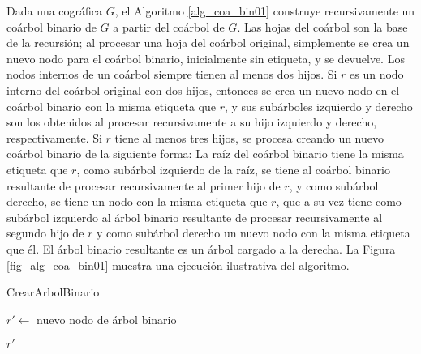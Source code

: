 Dada una cogr\'afica $G$, el Algoritmo \ref{alg_coa_bin01} construye
recursivamente un co\'arbol binario de $G$ a partir del co\'arbol de $G$.
Las hojas del co\'arbol son la base de la recursi\'on; al procesar una hoja
del co\'arbol original, simplemente se crea un nuevo nodo para el co\'arbol
binario, inicialmente sin etiqueta, y se devuelve.  Los nodos internos de
un co\'arbol siempre tienen al menos dos hijos.   Si $r$ es un nodo interno
del co\'arbol original con dos hijos, entonces se crea un nuevo nodo en
el co\'arbol binario con la misma etiqueta que $r$, y sus sub\'arboles
izquierdo y derecho son los obtenidos al procesar recursivamente a su
hijo izquierdo y derecho, respectivamente.   Si $r$ tiene al menos tres
hijos, se procesa creando un nuevo coárbol binario de la siguiente forma:
La raíz del coárbol binario tiene la misma etiqueta que $r$, como
sub\'arbol izquierdo de la ra\'iz, se tiene al coárbol binario resultante
de procesar recursivamente al primer hijo de $r$, y como sub\'arbol derecho,
se tiene un nodo con la misma etiqueta que $r$, que a su vez tiene como
sub\'arbol izquierdo al árbol binario resultante de procesar recursivamente
al segundo hijo de $r$ y como sub\'arbol derecho un nuevo nodo con la misma
etiqueta que \'el. El árbol binario resultante es un árbol cargado a la
derecha. La Figura \ref{fig_alg_coa_bin01} muestra
una ejecución ilustrativa del algoritmo.

\begin{algorithm}[ht!]
\caption{CrearArbolBinario}
\label{alg_coa_bin01}
\DontPrintSemicolon %

$r' \gets $ nuevo nodo de árbol binario\;

\Return $r'$\;

\end{algorithm}

